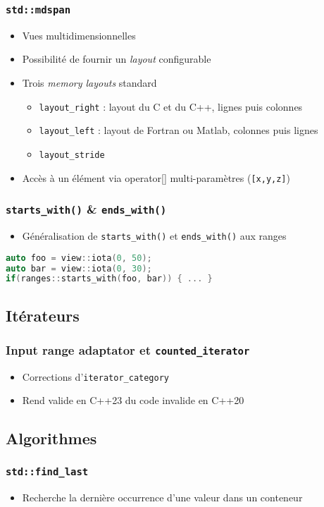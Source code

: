 \documentclass[C++.tex]{subfiles}
\begin{document}
\begin{frame}[fragile]
	\frametitle{\lstinline|std::mdspan|}
	\begin{itemize}
		\item Vues multidimensionnelles
		\item Possibilité de fournir un \textit{layout} configurable
		\item Trois \textit{memory layouts} standard
		\begin{itemize}
			\item \lstinline|layout_right| : layout du C et du C++, lignes puis colonnes
			\item \lstinline|layout_left| : layout de Fortran ou Matlab, colonnes puis lignes
			\item \lstinline|layout_stride| 
		\end{itemize}
		\item Accès à un élément via operator[] multi-paramètres (\lstinline|[x,y,z]|)
	\end{itemize}
\end{frame}

\begin{frame}[fragile]
	\frametitle{\lstinline|starts_with()| \& \lstinline|ends_with()|}
	\begin{itemize}
		\item Généralisation de \lstinline|starts_with()| et \lstinline|ends_with()| aux ranges
	\end{itemize}

	\begin{lstlisting}[language=C++]
auto foo = view::iota(0, 50);
auto bar = view::iota(0, 30);
if(ranges::starts_with(foo, bar)) { ... }\end{lstlisting}
\end{frame}

\subsection*{Itérateurs}
\begin{frame}[fragile]
	\frametitle{Input range adaptator et \lstinline|counted_iterator|}
	\begin{itemize}
		\item Corrections d'\lstinline|iterator_category|
		\item Rend valide en C++23 du code invalide en C++20
	\end{itemize}
\end{frame}

\subsection*{Algorithmes}
\begin{frame}[fragile]
	\frametitle{\lstinline|std::find_last|}
	\begin{itemize}
		\item Recherche la dernière occurrence d'une valeur dans un conteneur
	\end{itemize}
\end{frame}
\end{document}
